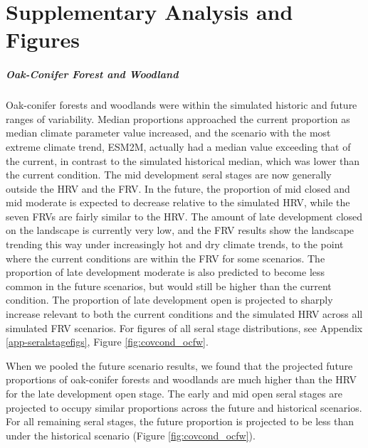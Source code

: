 \appendix

\chapter{Supplementary Analysis and Figures}

\paragraph{Oak-Conifer Forest and Woodland} Oak-conifer forests and woodlands were within the simulated historic and future ranges of variability. Median proportions approached the current proportion as median climate parameter value increased, and the scenario with the most extreme climate trend, ESM2M, actually had a median value exceeding that of the current, in contrast to the simulated historical median, which was lower than the current condition. The mid development seral stages are now generally outside the HRV and the FRV. In the future, the proportion of mid closed and mid moderate is expected to decrease relative to the simulated HRV, while the seven FRVs are fairly similar to the HRV. The amount of late development closed on the landscape is currently very low, and the FRV results show the landscape trending this way under increasingly hot and dry climate trends, to the point where the current conditions are within the FRV for some scenarios. The proportion of late development moderate is also predicted to become less common in the future scenarios, but would still be higher than the current condition. The proportion of late development open is projected to sharply increase relevant to both the current conditions and the simulated HRV across all simulated FRV scenarios. For figures of all seral stage distributions, see Appendix \ref{app-seralstagefigs}, Figure \ref{fig:covcond_ocfw}.

When we pooled the future scenario results, we found that the projected future proportions of oak-conifer forests and woodlands are much higher than the HRV for the late development open stage. The early and mid open seral stages are projected to occupy similar proportions across the future and historical scenarios. For all remaining seral stages, the future proportion is projected to be less than under the historical scenario (Figure \ref{fig:covcond_ocfw}).

